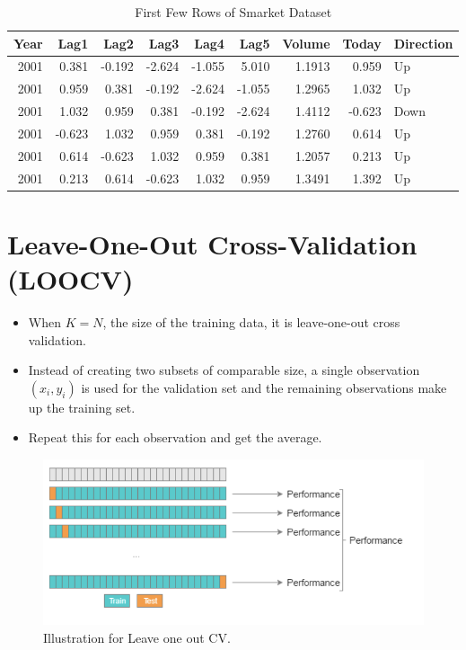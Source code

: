 \documentclass[
  letterpaper,
  DIV=11,
  numbers=noendperiod]{scrreprt}
\begin{document}
\begin{table}
\centering
\caption{\label{tab:unnamed-chunk-2} First Few Rows of Smarket Dataset}
\centering
\fontsize{8}{10}\selectfont
\begin{tabular}[t]{r|r|r|r|r|r|r|r|l}
\hline
Year & Lag1 & Lag2 & Lag3 & Lag4 & Lag5 & Volume & Today & Direction\\
\hline
2001 & 0.381 & -0.192 & -2.624 & -1.055 & 5.010 & 1.1913 & 0.959 & Up\\
\hline
2001 & 0.959 & 0.381 & -0.192 & -2.624 & -1.055 & 1.2965 & 1.032 & Up\\
\hline
2001 & 1.032 & 0.959 & 0.381 & -0.192 & -2.624 & 1.4112 & -0.623 & Down\\
\hline
2001 & -0.623 & 1.032 & 0.959 & 0.381 & -0.192 & 1.2760 & 0.614 & Up\\
\hline
2001 & 0.614 & -0.623 & 1.032 & 0.959 & 0.381 & 1.2057 & 0.213 & Up\\
\hline
2001 & 0.213 & 0.614 & -0.623 & 1.032 & 0.959 & 1.3491 & 1.392 & Up\\
\hline
\end{tabular}
\end{table}

\section{Leave-One-Out Cross-Validation
(LOOCV)}\label{leave-one-out-cross-validation-loocv}

\begin{itemize}
\item
  When \(K=N\), the size of the training data, it is leave-one-out cross
  validation.
\item
  Instead of creating two subsets of comparable size, a single
  observation \((x_i, y_i)\) is used for the validation set and the
  remaining observations make up the training set.
\item
  Repeat this for each observation and get the average.
\end{itemize}

\begin{figure}[H]

{\centering \includegraphics[width=0.8\linewidth,height=\textheight,keepaspectratio]{fig/LOOCV.png}

}

\caption{Illustration for Leave one out CV.}

\end{figure}%
\end{document}

